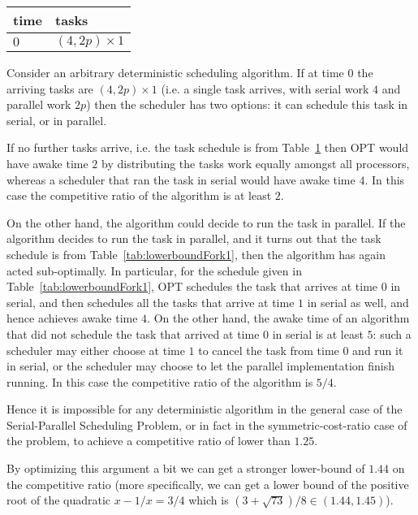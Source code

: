 \documentclass[twocolumn]{article}[10pt]
\begin{document}
\begin{table}[H]
\caption{}
\label{tab:lowerboundFork2}
\centering
\begin{tabular}{|l|l|}
\hline
time & tasks                    \\ \hline
$0$  & $(4, 2p) \times 1$       \\ \hline
\end{tabular}
\end{table}

Consider an arbitrary deterministic scheduling algorithm. If at
time $0$ the arriving tasks are $(4, 2p)\times 1$ (i.e. a single
task arrives, with serial work $4$ and parallel work $2p$) then
the scheduler has two options: it can schedule this task in
serial, or in parallel.

If no further tasks arrive, i.e. the task schedule is from
Table~\ref{tab:lowerboundFork2} then OPT would have awake time
$2$ by distributing the tasks work equally amongst all
processors, whereas a scheduler that ran the task in serial would
have awake time $4$. In this case the competitive ratio of the
algorithm is at least $2$.

On the other hand, the algorithm could decide to run the task in
parallel. If the algorithm decides to run the task in parallel,
and it turns out that the task schedule is from
Table~\ref{tab:lowerboundFork1}, then the algorithm has again
acted sub-optimally. In particular, for the schedule given in
Table~\ref{tab:lowerboundFork1}, OPT schedules the task that
arrives at time $0$ in serial, and then schedules all the tasks
that arrive at time $1$ in serial as well, and hence achieves
awake time $4$. On the other hand, the awake time of an algorithm
that did not schedule the task that arrived at time $0$ in
serial is at least $5$: such a scheduler may either choose at
time $1$ to cancel the task from time $0$ and run it in serial,
or the scheduler may choose to let the parallel implementation
finish running. In this case the competitive ratio of the
algorithm is $5/4$.

Hence it is impossible for any deterministic algorithm in the
general case of the Serial-Parallel Scheduling Problem, or in
fact in the symmetric-cost-ratio case of the problem, to achieve
a competitive ratio of lower than $1.25$.

By optimizing this argument a bit we can get a stronger
lower-bound of $1.44$ on the competitive ratio (more
specifically, we can get a lower bound of the positive root of
the quadratic $x - 1/x = 3/4$ which is $(3+\sqrt{73})/8 \in
(1.44, 1.45)$).
\end{document}
